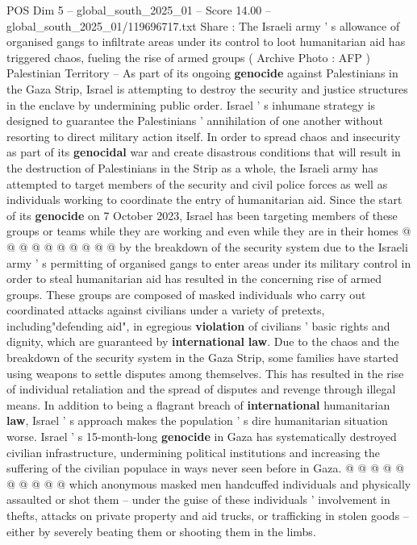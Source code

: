 \begin{textsample}{POS Dim 5 – global\_south\_2025\_01 – Score 14.00 – global\_south\_2025\_01/119696717.txt}  \label{ex:f5_pos_356}
Share : The Israeli army ' s allowance of organised gangs to infiltrate areas under its control to loot humanitarian aid has triggered chaos, fueling the rise of armed groups ( Archive Photo : AFP ) Palestinian Territory -- As part of its ongoing \textbf{genocide} against Palestinians in the Gaza Strip, Israel is attempting to destroy the security and justice structures in the enclave by undermining public order.
Israel ' s inhumane strategy is designed to guarantee the Palestinians ' annihilation of one another without resorting to direct military action itself.
In order to spread chaos and insecurity as part of its \textbf{genocidal} war and create disastrous conditions that will result in the destruction of Palestinians in the Strip as a whole, the Israeli army has attempted to target members of the security and civil police forces as well as individuals working to coordinate the entry of humanitarian aid.
Since the start of its \textbf{genocide} on 7 October 2023, Israel has been targeting members of these groups or teams while they are working and even while they are in their homes @ @ @ @ @ @ @ @ @ @ by the breakdown of the security system due to the Israeli army ' s permitting of organised gangs to enter areas under its military control in order to steal humanitarian aid has resulted in the concerning rise of armed groups.
These groups are composed of masked individuals who carry out coordinated attacks against civilians under a variety of pretexts, including"defending aid", in egregious \textbf{violation} of civilians ' basic rights and dignity, which are guaranteed by \textbf{international} \textbf{law}.
Due to the chaos and the breakdown of the security system in the Gaza Strip, some families have started using weapons to settle disputes among themselves.
This has resulted in the rise of individual retaliation and the spread of disputes and revenge through illegal means.
In addition to being a flagrant breach of \textbf{international} humanitarian \textbf{law}, Israel ' s approach makes the population ' s dire humanitarian situation worse.
Israel ' s 15-month-long \textbf{genocide} in Gaza has systematically destroyed civilian infrastructure, undermining political institutions and increasing the suffering of the civilian populace in ways never seen before in Gaza. @ @ @ @ @ @ @ @ @ @ which anonymous masked men handcuffed individuals and physically assaulted or shot them -- under the guise of these individuals ' involvement in thefts, attacks on private property and aid trucks, or trafficking in stolen goods -- either by severely beating them or shooting them in the limbs.

\end{textsample}
